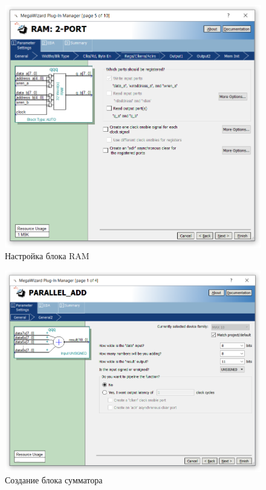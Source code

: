 \documentclass[a4paper,14pt]{article}
\begin{document}
\begin{figure}[H]
	\centering
	\includegraphics[width=\linewidth]{image/ram_2}
	\caption{Настройка блока RAM}
	\label{fig:ram_2}
\end{figure}

\begin{figure}[H]
	\centering
	\includegraphics[width=\linewidth]{image/add}
	\caption{Создание блока сумматора}
	\label{fig:add}
\end{figure}
\end{document}

